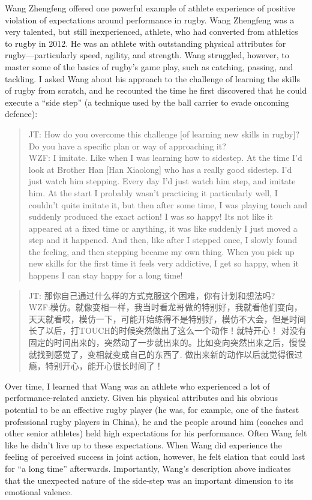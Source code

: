 \begin{CJK}{UTF8}{gbsn}
Wang Zhengfeng offered one powerful example of athlete experience of positive violation of expectations around performance in rugby.  Wang Zhengfeng was a very talented, but still inexperienced, athlete, who had converted from athletics to rugby in 2012.  He was an athlete with outstanding physical attributes for rugby---particularly speed, agility, and strength.  Wang struggled, however, to master some of the basics of rugby's game play, such as catching, passing, and tackling. I asked Wang about his approach to the challenge of learning the skills of rugby from scratch, and he recounted the time he first discovered that he could execute a ``side step'' (a technique used by the ball carrier to evade oncoming defence):

    \begin{quote}
      JT: How do you overcome this challenge [of learning new skills in rugby]? Do you have a specific plan or way of approaching it? \\
      WZF: I imitate.  Like when I was learning how to sidestep. At the time I'd look at Brother Han [Han Xiaolong] who has a really good sidestep. I'd just watch him stepping.  Every day I'd just watch him step, and imitate him.  At the start I probably wasn't practicing it particularly well, I couldn't quite imitate it, but then after some time, I was playing touch and suddenly produced the exact action! I was so happy! Its not like it appeared at a fixed time or anything, it was like suddenly I just moved a step and it happened. And then, like after I stepped once, I slowly found the feeling, and then stepping became my own thing.  When you pick up new skills for the first time it feels very addictive, I get so happy, when it happens I can stay happy for a long time!
    \end{quote}

    \begin{quote}
      JT: 那你自己通过什么样的方式克服这个困难，你有计划和想法吗? \\
      WZF:模仿。就像变相一样，我当时看龙哥做的特别好，我就看他们变向，天天就看哎，模仿一下，可能开始练得不是特别好，模仿不大会，但是时间长了以后，打TOUCH的时候突然做出了这么一个动作！就特开心！ 对没有固定的时间出来的，突然动了一步就出来的。比如变向突然出来之后，慢慢就找到感觉了，变相就变成自己的东西了. 做出来新的动作以后就觉得很过瘾，特别开心，能开心很长时间了！
    \end{quote}

Over time, I learned that Wang was an athlete who experienced a lot of performance-related anxiety.  Given his physical attributes and his obvious potential to be an effective rugby player (he was, for example, one of the fastest professional rugby players in China), he and the people around him (coaches and other senior athletes) held high expectations for his performance.  Often Wang felt like he didn't live up to these expectations.  When Wang did experience the feeling of perceived success in joint action, however, he felt elation that could last for ``a long time'' afterwards.  Importantly, Wang's description above indicates that the unexpected nature of the side-step was an important dimension to its emotional valence.


\end{CJK}
